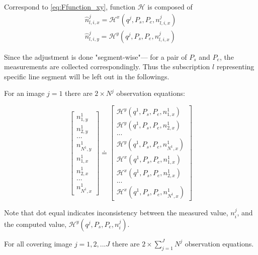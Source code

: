 Correspond to \cref{eq:Ffunction_xy}, function $\mathcal{H}$ is composed of
\begin{equation}
\begin{split}
\hat{n}^j_{l,i,x} = \mathcal{H}^x(q^j,P_s,P_e,n^j_{l,i,x})\\
\hat{n}^j_{l,i,y} = \mathcal{H}^y(q^j,P_s,P_e,n^j_{l,i,x})
\end{split}
\end{equation}

Since the adjustment is done "segment-wise"--- for a pair of $P_s$ and $P_e$, the measurements are collected correspondingly. Thus the subscription $l$ representing specific line segment will be left out in the followings.

For an image $j=1$ there are $2\times N^j$ observation equations:

\begin{equation} \label{eq:obs-camera1}
\begin{bmatrix}
n^1_{1,y}\\[0.3em]
n^1_{2,y}\\[0.3em]
...\\[0.3em]
n^1_{N^1,y}\\[0.5em]
n^1_{1,x}\\[0.3em]
n^1_{2,x}\\[0.3em]
...\\[0.3em]
n^1_{N^1,x}
\end{bmatrix}
\doteq %
\begin{bmatrix}
\mathcal{H}^y(q^1,P_s,P_e,n^1_{1,x})\\[0.3em]
\mathcal{H}^y(q^1,P_s,P_e,n^1_{2,x})\\[0.3em]
...\\[0.3em]
\mathcal{H}^y(q^1,P_s,P_e,n^1_{N^1,x})\\[0.5em]
\mathcal{H}^x(q^1,P_s,P_e,n^1_{1,x})\\[0.3em]
\mathcal{H}^x(q^1,P_s,P_e,n^1_{2,x})\\[0.3em]
...\\[0.3em]
\mathcal{H}^x(q^1,P_s,P_e,n^1_{N^1,x})
\end{bmatrix}
\end{equation}

Note that dot equal indicates inconsistency between the measured value, $n^j_i$, and the computed value, $\mathcal{H}^y(q^j,P_s,P_e,n^j_i)$.

For all covering image $j=1,2,...J$ there are $2\times\displaystyle\sum_{j=1}^{J}N^j$ observation equations.

